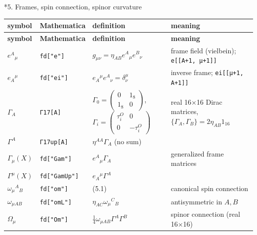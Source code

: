 \documentclass[10pt,a4paper]{article}
\makeatletter
\renewcommand\section{\@startsection{section}{1}{\z@}{-3.5ex \@plus -1ex \@minus -.2ex}{2.3ex \@plus.2ex}{\normalfont\Large\bfseries\raggedright}}
\makeatother
\begin{document}
\section*{5. Frames, spin connection, spinor curvature}
{\small
\begin{longtable}{>{\raggedright\arraybackslash}p{}>{\raggedright\arraybackslash}p{}>{\raggedright\arraybackslash}p{}>{\raggedright\arraybackslash}p{}}
\toprule
\textbf{symbol} & \textbf{Mathematica} & \textbf{definition} & \textbf{meaning} \\
\midrule\endfirsthead
\toprule
\textbf{symbol} & \textbf{Mathematica} & \textbf{definition} & \textbf{meaning} \\
\midrule\endhead
\endfoot
\bottomrule\endlastfoot
$e^A{}_\mu$ & \texttt{fd["e"]} & $g_{\mu\nu}=\eta_{AB}e^A{}_\mu e^B{}_\nu$ & frame field (vielbein); \texttt{e[[A+1, μ+1]]} \\
$e_A{}^\mu$ & \texttt{fd["ei"]} & $e_A{}^\mu e^A{}_\nu=\delta^\mu_\nu$ & inverse frame; \texttt{ei[[μ+1, A+1]]} \\
$\Gamma_A$ & \texttt{Γ17[A]} & $\Gamma_0=\left(\begin{smallmatrix}0&1_8\\1_8&0\end{smallmatrix}\right)$, $\Gamma_i=\left(\begin{smallmatrix}\tau^O_i&0\\0&-\tau^O_i\end{smallmatrix}\right)$ & real 16×16 Dirac matrices, $\lbrace\Gamma_A,\Gamma_B\rbrace=2\eta_{AB}1_{16}$ \\
$\Gamma^A$ & \texttt{Γ17up[A]} & $\eta^{AA}\Gamma_A$ (no sum) &  \\
$\Gamma_\mu(X)$ & \texttt{fd["Gam"]} & $e^A{}_\mu\Gamma_A$ & generalized frame matrices \\
$\Gamma^\mu(X)$ & \texttt{fd["GamUp"]} & $e_A{}^\mu\Gamma^A$ &  \\
$\omega_\mu{}^A{}_B$ & \texttt{fd["om"]} & (5.1) & canonical spin connection \\
$\omega_{\mu AB}$ & \texttt{fd["omL"]} & $\eta_{AC}\omega_\mu{}^C{}_B$ & antisymmetric in $A,B$ \\
$\Omega_\mu$ & \texttt{fd["Om"]} & $\tfrac14\omega_{\mu AB}\Gamma^A\Gamma^B$ & spinor connection (real 16×16) \\

\end{longtable}}
\end{document}
